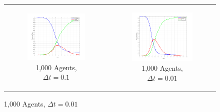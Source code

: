 \begin{figure}
\begin{center}
\begin{tabular}{c c}
    	\\
    	
		\begin{subfigure}[b]{0.3\textwidth}
			\centering
			\includegraphics[width=1\textwidth, angle=0]{./fig/step2_yampa/SIR_1000agents_150t_01dt.png}
			\caption{1,000 Agents, $\Delta t = 0.1$}
			\label{fig:sir_abs_approximating_01dt_1000agents}
		\end{subfigure}
		& 
		\begin{subfigure}[b]{0.3\textwidth}
			\centering
			\includegraphics[width=1\textwidth, angle=0]{./fig/step2_yampa/SIR_1000agents_150t_001dt.png}
			\caption{1,000 Agents, $\Delta t = 0.01$}
			\label{fig:sir_abs_approximating_001dt_1000agents}
		\end{subfigure}
	\end{tabular}
	

\end{center}
\end{figure}
